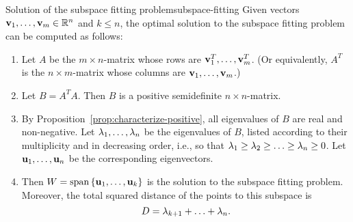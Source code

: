 \begin{proposition}{Solution of the subspace fitting problem}{subspace-fitting}
  Given vectors $\vect{v}_1,\ldots,\vect{v}_m\in\R^n$ and $k\leq n$,
  the optimal solution to the subspace fitting problem can be computed
  as follows:
  \begin{enumerate}
  \item Let $A$ be the $m\times n$-matrix whose rows are
    $\vect{v}_1^T,\ldots,\vect{v}_m^T$. (Or equivalently, $A^T$ is the
    $n\times m$-matrix whose columns are
    $\vect{v}_1,\ldots,\vect{v}_m$.)
  \item Let $B=A^TA$. Then $B$ is a positive semidefinite
    $n\times n$-matrix.
  \item By Proposition~\ref{prop:characterize-positive}, all
    eigenvalues of $B$ are real and non-negative. Let
    $\lambda_1,\ldots,\lambda_n$ be the eigenvalues of $B$, listed
    according to their multiplicity and in decreasing order, i.e., so
    that $\lambda_1\geq\lambda_2\geq\ldots\geq\lambda_n\geq
    0$. Let $\vect{u}_1,\ldots,\vect{u}_n$ be the corresponding
    eigenvectors.
  \item Then $W=\sspan\set{\vect{u}_1,\ldots,\vect{u}_k}$ is the
    solution to the subspace fitting problem.  Moreover, the total
    squared distance of the points to this subspace is
    \begin{equation*}
      D = \lambda_{k+1} + \ldots + \lambda_n.
    \end{equation*}
  \end{enumerate}
\end{proposition}

